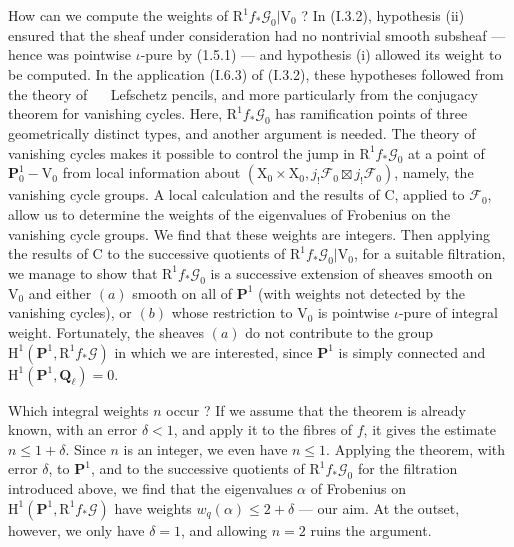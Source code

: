 \documentclass[11pt,leqno]{article}
\newcommand{\Page}[1]{\ifvmode\noindent\else\unskip\ \fi{\footnotesize\textcolor{gray}{[p.\,#1]}}\ \ignorespaces}
\begin{document}
How can we compute the weights of \(\mathrm{R}^1 f_*\mathscr{G}_0|\mathrm{V}_0\) ? In (I.3.2), hypothesis (ii) ensured that the sheaf under consideration had no nontrivial smooth subsheaf — hence was pointwise \(\iota\)-pure by (1.5.1) — and hypothesis (i) allowed its weight to be computed. In the application (I.6.3) of (I.3.2), these hypotheses followed from the theory of
\Page{141}
Lefschetz pencils, and more particularly from the conjugacy theorem for vanishing cycles. Here, \(\mathrm{R}^1 f_*\mathscr{G}_0\) has ramification points of three geometrically distinct types, and another argument is needed. The theory of vanishing cycles makes it possible to control the jump in \(\mathrm{R}^1 f_*\mathscr{G}_0\) at a point of \(\mathbf{P}_0^1-\mathrm{V}_0\) from local information about \((\mathrm{X}_0\times\mathrm{X}_0,j_!\mathscr{F}_0\boxtimes j_!\mathscr{F}_0)\), namely, the vanishing cycle groups. A local calculation and the results of C, applied to \(\mathscr{F}_0\), allow us to determine the weights of the eigenvalues of Frobenius on the vanishing cycle groups. We find that these weights are integers. Then applying the results of C to the successive quotients of \(\mathrm{R}^1 f_*\mathscr{G}_0|\mathrm{V}_0\), for a suitable filtration, we manage to show that \(\mathrm{R}^1 f_*\mathscr{G}_0\) is a successive extension of sheaves smooth on \(\mathrm{V}_0\) and either \((a)\) smooth on all of \(\mathbf{P}^1\) (with weights not detected by the vanishing cycles), or \((b)\) whose restriction to \(\mathrm{V}_0\) is pointwise \(\iota\)-pure of integral weight. Fortunately, the sheaves \((a)\) do not contribute to the group \(\mathrm{H}^1(\mathbf{P}^1,\mathrm{R}^1 f_*\mathscr{G})\) in which we are interested, since \(\mathbf{P}^1\) is simply connected and \(\mathrm{H}^1(\mathbf{P}^1,\mathbf{Q}_\ell)=0\).

Which integral weights \(n\) occur ? If we assume that the theorem is already known, with an error \(\delta<1\), and apply it to the fibres of \(f\), it gives the estimate \(n\leq 1+\delta\). Since \(n\) is an integer, we even have \(n\leq 1\). Applying the theorem, with error \(\delta\), to \(\mathbf{P}^1\), and to the successive quotients of \(\mathrm{R}^1 f_*\mathscr{G}_0\) for the filtration introduced above, we find that the eigenvalues \(\alpha\) of Frobenius on \(\mathrm{H}^1(\mathbf{P}^1,\mathrm{R}^1 f_*\mathscr{G})\) have weights \(w_q(\alpha)\leq 2+\delta\) — our aim. At the outset, however, we only have \(\delta=1\), and allowing \(n=2\) ruins the argument.
\end{document}
